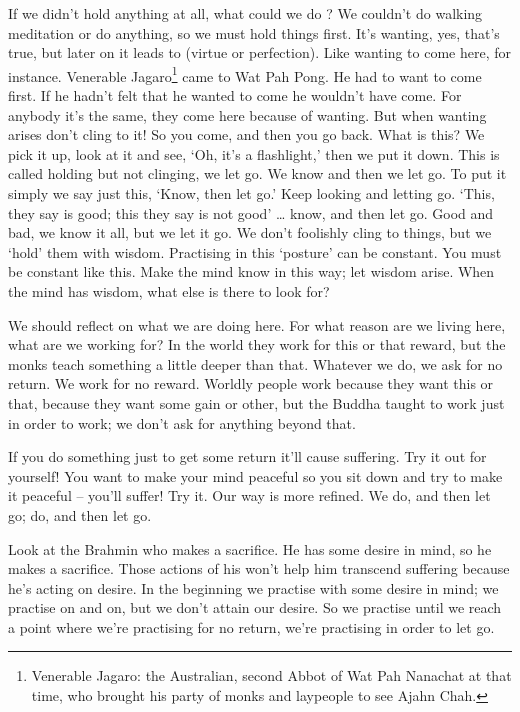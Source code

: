 If we didn't hold anything at all, what could we do ? We couldn't do walking meditation or do anything, so we must hold things first. It's wanting, yes, that's true, but later on it leads to  (virtue or perfection). Like wanting to come here, for instance. Venerable Jagaro\footnote{Venerable Jagaro: the Australian, second Abbot of Wat Pah Nanachat at that time, who brought his party of monks and laypeople to see Ajahn Chah.} came to Wat Pah Pong. He had to want to come first. If he hadn't felt that he wanted to come he wouldn't have come. For anybody it's the same, they come here because of wanting. But when wanting arises don't cling to it! So you come, and then you go back. What is this? We pick it up, look at it and see, `Oh, it's a flashlight,' then we put it down. This is called holding but not clinging, we let go. We know and then we let go. To put it simply we say just this, `Know, then let go.' Keep looking and letting go. `This, they say is good; this they say is not good' \ldots{} know, and then let go. Good and bad, we know it all, but we let it go. We don't foolishly cling to things, but we `hold' them with wisdom. Practising in this `posture' can be constant. You must be constant like this. Make the mind know in this way; let wisdom arise. When the mind has wisdom, what else is there to look for? 

We should reflect on what we are doing here. For what reason are we living here, what are we working for? In the world they work for this or that reward, but the monks teach something a little deeper than that. Whatever we do, we ask for no return. We work for no reward. Worldly people work because they want this or that, because they want some gain or other, but the Buddha taught to work just in order to work; we don't ask for anything beyond that. 

If you do something just to get some return it'll cause suffering. Try it out for yourself! You want to make your mind peaceful so you sit down and try to make it peaceful -- you'll suffer! Try it. Our way is more refined. We do, and then let go; do, and then let go.

Look at the Brahmin who makes a sacrifice. He has some desire in mind, so he makes a sacrifice. Those actions of his won't help him transcend suffering because he's acting on desire. In the beginning we practise with some desire in mind; we practise on and on, but we don't attain our desire. So we practise until we reach a point where we're practising for no return, we're practising in order to let go. 

